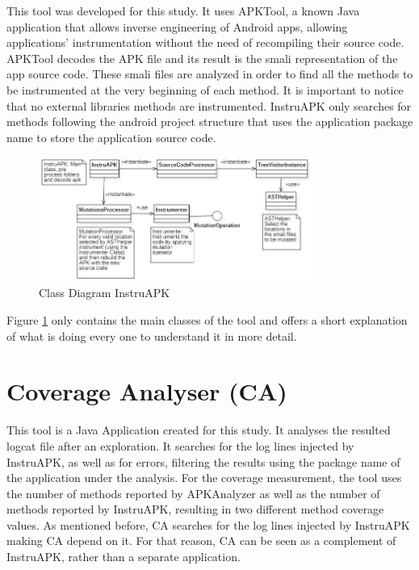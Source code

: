 This tool was developed for this study. It uses APKTool, a known Java application that allows inverse engineering of Android apps, allowing applications' instrumentation without the need of recompiling their source code. APKTool decodes the APK file and its result is the smali representation of the app source code. These smali files are analyzed in order to find all the methods to be instrumented at the very beginning of each method. It is important to notice that no external libraries methods are instrumented. InstruAPK only searches for methods following the android project structure that uses the application package name to store the application source code.

\begin{figure}[h]
\centering
\includegraphics[width=0.8\textwidth]{../Figures/ClassDiagramInstruAPK.jpg}
\caption{Class Diagram InstruAPK}\label{fig:instruAPK}
\end{figure}

Figure \ref{fig:instruAPK} only contains the main classes of the tool and offers a short explanation of what is doing every one to understand it in more detail.

\section{Coverage Analyser (CA)}\label{sec:ca}

This tool is a Java Application created for this study. It analyses the resulted logcat file after an exploration. It searches for the log lines injected by InstruAPK, as well as for errors, filtering the results using the package name of the application under the analysis. For the coverage measurement, the tool uses the number of methods reported by APKAnalyzer as well as the number of methods reported by InstruAPK, resulting in two different method coverage values. As mentioned before, CA searches for the log lines injected by InstruAPK making CA depend on it. For that reason, CA can be seen as a complement of InstruAPK, rather than a separate application.

